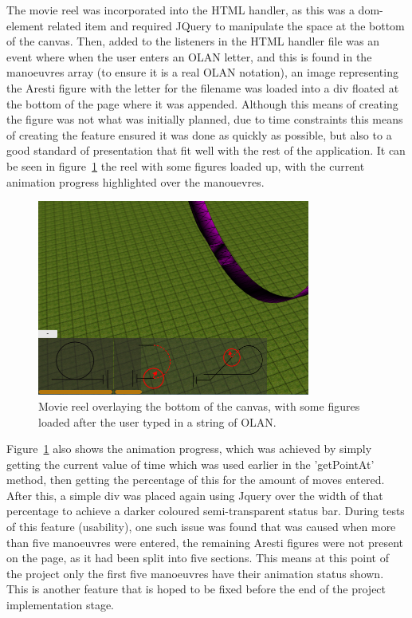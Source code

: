 The movie reel was incorporated into the HTML handler, as this was a dom-element related item and required JQuery to manipulate the space at the bottom of the canvas. Then, added to the listeners in the HTML handler file was an event where when the user enters an OLAN letter, and this is found in the manoeuvres array (to ensure it is a real OLAN notation), an image representing the Aresti figure with the letter for the filename was loaded into a div floated at the bottom of the page where it was appended. Although this means of creating the figure was not what was initially planned, due to time constraints this means of creating the feature ensured it was done as quickly as possible, but also to a good standard of presentation that fit well with the rest of the application. It can be seen in figure~\ref{fig:movie} the reel with some figures loaded up, with the current animation progress highlighted over the manouevres.

\clearpage 

\begin{figure}[h]
  \centering
      \includegraphics[width=0.8\textwidth]{images/movie.png}
  \caption{Movie reel overlaying the bottom of the canvas, with some figures loaded after the user typed in a string of OLAN.}
  \label{fig:movie}
\end{figure}

Figure~\ref{fig:movie} also shows the animation progress, which was achieved by simply getting the current value of time which was used earlier in the 'getPointAt' method, then getting the percentage of this for the amount of moves entered. After this, a simple div was placed again using Jquery over the width of that percentage to achieve a darker coloured semi-transparent status bar. During tests of this feature (usability), one such issue was found that was caused when more than five manoeuvres were entered, the remaining Aresti figures were not present on the page, as it had been split into five sections. This means at this point of the project only the first five manoeuvres have their animation status shown. This is another feature that is hoped to be fixed before the end of the project implementation stage. 


